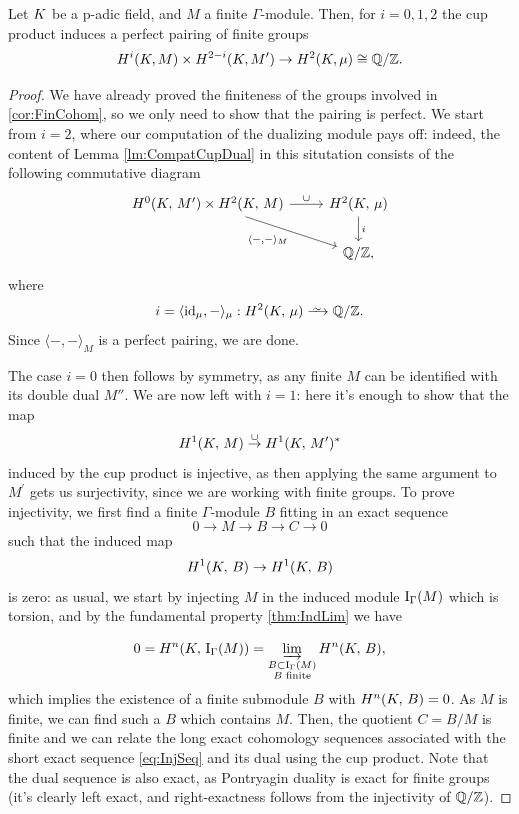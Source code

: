 \documentclass[a4paper, oneside]{memoir}
\begin{document}
\begin{theorem}
    Let $K$ be a p-adic field, and $M$ a finite $\Gamma$-module.
    Then, for $i=0,1,2$ the cup product induces a perfect pairing of finite groups
    \begin{equation*}
        H^i(K, M) \times H^{2-i}(K, M^{\prime}) \to H^2(K, \mu) \cong \mathbb{Q}/\mathbb{Z}.
    \end{equation*}
\end{theorem}
\begin{proof}
    We have already proved the finiteness of the groups involved in \ref{cor:FinCohom}, so we only need to show that the pairing is perfect.
    We start from $i=2$, where our computation of the dualizing module pays off: indeed, the content of Lemma \ref{lm:CompatCupDual}
    in this situtation consists of the following commutative diagram
    \begin{equation*}
        \begin{tikzcd}
            {\H{0}{\K}{M^\prime}  \times \HH{\K}{M}} \ar[swap, rd, "\langle - {,} - \rangle_M "] \ar[r, "\cup"] & \HH{\K}{\mu} \ar[d, "i"] \\
            & \Q/\Z,
        \end{tikzcd}
    \end{equation*}
    where
    \[
        i = \langle \id_{\mu}, - \rangle_\mu : \H{2}{\K}{\mu} \Iso \Q/\Z.
    \]
    Since \(\langle -{,}- \rangle_M\) is a perfect pairing, we are done.

    The case $i=0$ then follows by symmetry, as any finite $M$ can be identified with its double dual $M''$.
    We are now left with $i=1$: here it's enough to show that the map
    \[
        H^{1}( K, \, M ) \overset{\cup}{\to} H^{1}( K, \, M^\prime )^*
    \]
    induced by the cup product is injective, as then applying the same argument to $M^\prime$ gets us surjectivity, since we are working with finite groups.
    To prove injectivity, we first find a finite $\Gamma$-module $B$ fitting in an exact sequence
    \begin{equation}\label{eq:InjSeq}
        0\to M\to B\to C\to 0
    \end{equation}
    such that the induced map
    \[
        H^{1}( K, \, B )\to H^{1}( K, \, B )
    \]
    is zero:
    as usual, we start by injecting $M$ in the induced module $\mathrm{I}_{\Gamma}(M)$ which is torsion, and by the fundamental property \ref{thm:IndLim} we have

    \[
        0=H^{n}( K, \, \mathrm{I}_{\Gamma}(M) )=\varinjlim_{\substack{B\subset\mathrm{I}_{\Gamma}(M) \\B\text{ finite}}}{H^{n}( K, \, B )},
    \]
    which implies the existence of a finite submodule \(B\) with \(H^{n}( K, \, B )=0\). As \(M\) is finite, we can find such a \(B\) which contains \(M\). Then, the quotient \(C=B/M\) is finite and we can relate the long exact cohomology sequences associated with the short exact sequence \eqref{eq:InjSeq}
    and its dual using the cup product. Note that the dual sequence is also exact, as Pontryagin duality is exact for finite groups (it's clearly left exact, and right-exactness follows from the injectivity of $\mathbb{Q}/\mathbb{Z}$).


\end{proof}
\end{document}
